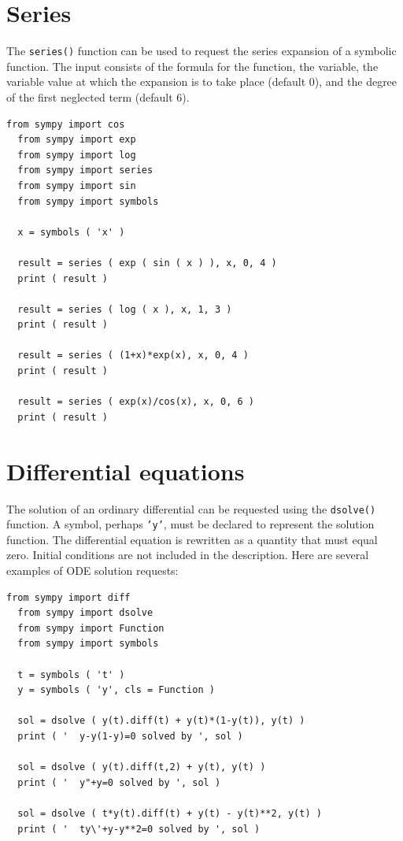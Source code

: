 \documentclass{article}
\begin{document}
\section{Series}

The {\tt{series()}} function can be used to request the series
expansion of a symbolic function.  The input consists of the
formula for the function, the variable, the variable value
at which the expansion is to take place (default 0), and 
the degree of the first neglected term (default 6).
\begin{lstlisting}[numbers=none]
  from sympy import cos
  from sympy import exp
  from sympy import log
  from sympy import series
  from sympy import sin
  from sympy import symbols

  x = symbols ( 'x' )

  result = series ( exp ( sin ( x ) ), x, 0, 4 )
  print ( result )

  result = series ( log ( x ), x, 1, 3 )
  print ( result )

  result = series ( (1+x)*exp(x), x, 0, 4 )
  print ( result )

  result = series ( exp(x)/cos(x), x, 0, 6 )
  print ( result )
\end{lstlisting}

\section{Differential equations}

The solution of an ordinary differential can be requested using
the {\tt{dsolve()}} function.  A symbol, perhaps {\tt{'y'}}, 
must be declared to represent the solution function.  The
differential equation is rewritten as a quantity that must
equal zero.  Initial conditions are not included in the 
description.  
\vskip 0.1in
Here are several examples of ODE solution requests:
\begin{lstlisting}[numbers=none]
  from sympy import diff
  from sympy import dsolve
  from sympy import Function
  from sympy import symbols

  t = symbols ( 't' )
  y = symbols ( 'y', cls = Function )

  sol = dsolve ( y(t).diff(t) + y(t)*(1-y(t)), y(t) )
  print ( '  y-y(1-y)=0 solved by ', sol )

  sol = dsolve ( y(t).diff(t,2) + y(t), y(t) )
  print ( '  y"+y=0 solved by ', sol )

  sol = dsolve ( t*y(t).diff(t) + y(t) - y(t)**2, y(t) )
  print ( '  ty\'+y-y**2=0 solved by ', sol )
\end{lstlisting}
\end{document}
